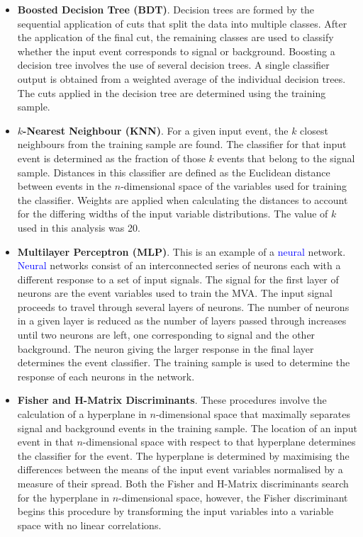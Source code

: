 \begin{itemize}
\item \textbf{Boosted Decision Tree (BDT)}.  Decision trees are formed by the sequential application of cuts that split the data into multiple classes.  After the application of the final cut, the remaining classes are used to classify whether the input event corresponds to signal or background.  Boosting a decision tree involves the use of several decision trees.  A single classifier output is obtained from a weighted average of the individual decision trees.  The cuts applied in the decision tree are determined using the training sample.  
\item \textbf{$k$-Nearest Neighbour (KNN)}.  For a given input event, the $k$ closest neighbours from the training sample are found.  The classifier for that input event is determined as the fraction of those $k$ events that belong to the signal sample.  Distances in this classifier are defined as the Euclidean distance between events in the $n$-dimensional space of the variables used for training the classifier.  Weights are applied when calculating the distances to account for the differing widths of the input variable distributions.  The value of $k$ used in this analysis was 20.
\item \textbf{Multilayer Perceptron (MLP)}.  This is an example of a \textcolor{blue}{neural} network.  \textcolor{blue}{Neural} networks consist of an interconnected series of neurons each with a different response to a set of input signals.  The signal for the first layer of neurons are the event variables used to train the MVA.  The input signal proceeds to travel through several layers of neurons.  The number of neurons in a given layer is reduced as the number of layers passed through increases until two neurons are left, one corresponding to signal and the other background.  The neuron giving the larger response in the final layer determines the event classifier.  The training sample is used to determine the response of each neurons in the network.
\item \textbf{Fisher and H-Matrix Discriminants}.  These procedures involve the calculation of a hyperplane in $n$-dimensional space that maximally separates signal and background events in the training sample.  The location of an input event in that $n$-dimensional space with respect to that hyperplane determines the classifier for the event.  The hyperplane is determined by maximising the differences between the means of the input event variables normalised by a measure of their spread.  Both the Fisher and H-Matrix discriminants search for the hyperplane in $n$-dimensional space, however, the Fisher discriminant begins this procedure by transforming the input variables into a variable space with no linear correlations.  

\end{itemize}
